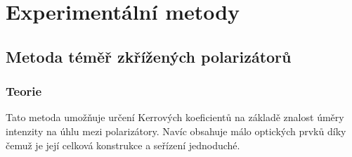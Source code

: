 \chapter{Experimentální metody}

\section{Metoda téměř zkřížených polarizátorů}
\subsection{Teorie}
Tato metoda umožňuje určení Kerrových koeficientů na základě znalost úměry intenzity na úhlu mezi polarizátory. Navíc obsahuje málo optických prvků díky čemuž je její celková konstrukce a seřízení jednoduché. 

